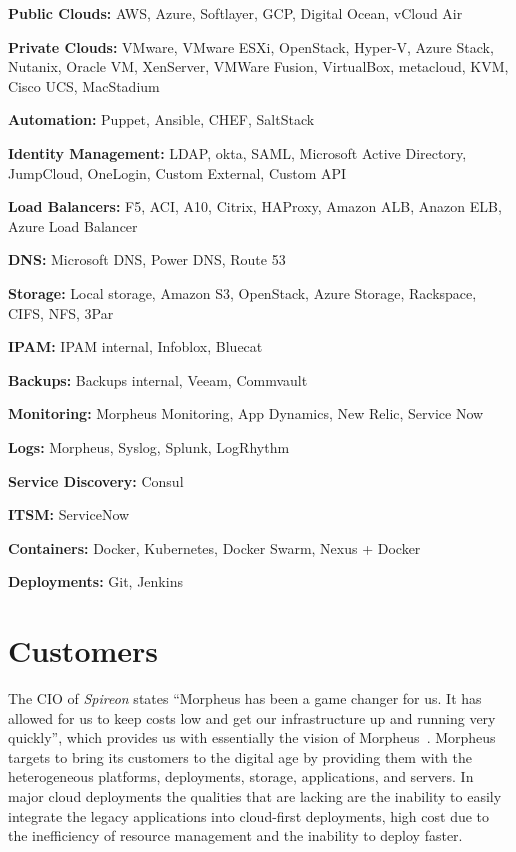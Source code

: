 \begin{description} 
	\item \textbf{Public Clouds:} AWS, Azure, Softlayer, GCP,
	Digital Ocean, vCloud Air 
	\item \textbf{Private Clouds:} VMware, VMware 
	ESXi,
	OpenStack, Hyper-V, Azure Stack, Nutanix, Oracle VM, XenServer, VMWare 
	Fusion,
	VirtualBox, metacloud, KVM, Cisco UCS, MacStadium 
	\item \textbf{Automation:}
	Puppet, Ansible, CHEF, SaltStack 
	\item \textbf{Identity Management:} LDAP,
	okta, SAML, Microsoft Active Directory, JumpCloud, OneLogin, Custom 
	External,
	Custom API 
	\item \textbf{Load Balancers:} F5, ACI, A10, Citrix, HAProxy, 
	Amazon
	ALB, Anazon ELB, Azure Load Balancer 
	\item \textbf{DNS:} Microsoft DNS, 
	Power
	DNS, Route 53 \item \textbf{Storage:} Local storage, Amazon S3, OpenStack,
	Azure Storage, Rackspace, CIFS, NFS, 3Par 
	\item \textbf{IPAM:} IPAM 
	internal,
	Infoblox, Bluecat 
	\item \textbf{Backups:} Backups internal, Veeam, Commvault
	\item \textbf{Monitoring:} Morpheus Monitoring, App Dynamics, New Relic,
	Service Now 
	\item \textbf{Logs:} Morpheus, Syslog, Splunk, LogRhythm 
	\item \textbf{Service Discovery:} Consul \item \textbf{ITSM:} ServiceNow 
	\item \textbf{Containers:} Docker, Kubernetes, Docker Swarm, Nexus + Docker 
	\item \textbf{Deployments:} Git, Jenkins 
\end{description}

\section{Customers} 
\label{sec:customers}

The CIO of \textit{Spireon} states ``Morpheus has been a game changer for us.
It has allowed for us to keep costs low and get our infrastructure up and
running very quickly'', which provides us with essentially the vision of
Morpheus~\cite{hid-sp18-416-www-morpheus-silicon-review}. Morpheus targets to
bring its customers to the digital age by providing them with the heterogeneous
platforms, deployments, storage, applications, and servers. In major cloud
deployments the qualities that are lacking are the inability to easily
integrate the legacy applications into cloud-first deployments, high cost due
to the inefficiency of resource management and the inability to deploy faster.


